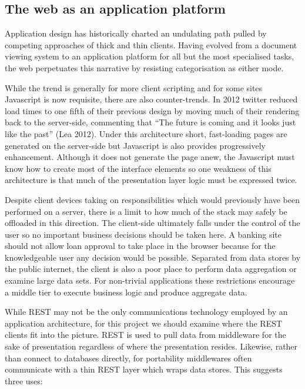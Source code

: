 \documentclass[]{article}
\begin{document}
\subsection{The web as an application platform}

Application design has historically charted an undulating path pulled by
competing approaches of thick and thin clients. Having evolved from a
document viewing system to an application platform for all but the most
specialised tasks, the web perpetuates this narrative by resisting
categorisation as either mode.

While the trend is generally for more client scripting and for some
sites Javascript is now requisite, there are also counter-trends. In
2012 twitter reduced load times to one fifth of their previous design by
moving much of their rendering back to the server-side, commenting that
``The future is coming and it looks just like the past'' (Lea 2012).
Under this architecture short, fast-loading pages are generated on the
server-side but Javascript is also provides progressively enhancement.
Although it does not generate the page anew, the Javascript must know
how to create most of the interface elements so one weakness of this
architecture is that much of the presentation layer logic must be
expressed twice.

Despite client devices taking on responsibilities which would previously
have been performed on a server, there is a limit to how much of the
stack may safely be offloaded in this direction. The client-side
ultimately falls under the control of the user so no important business
decisions should be taken here. A banking site should not allow loan
approval to take place in the browser because for the knowledgeable user
any decision would be possible. Separated from data stores by the public
internet, the client is also a poor place to perform data aggregation or
examine large data sets. For non-trivial applications these restrictions
encourage a middle tier to execute business logic and produce aggregate
data.

While REST may not be the only communications technology employed by an
application architecture, for this project we should examine where the
REST clients fit into the picture. REST is used to pull data from
middleware for the sake of presentation regardless of where the
presentation resides. Likewise, rather than connect to databases
directly, for portability middlewares often communicate with a thin REST
layer which wraps data stores. This suggests three uses:
\end{document}
